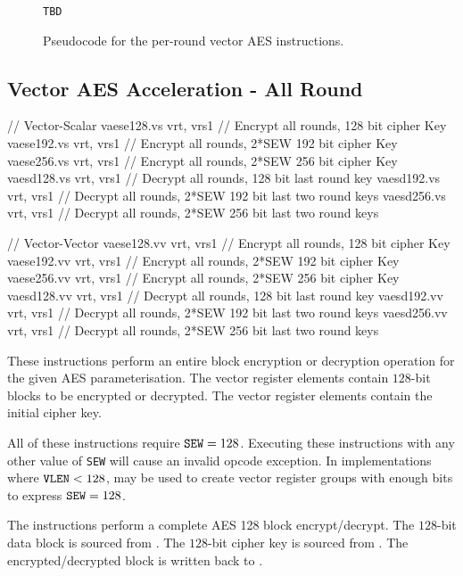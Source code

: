 \begin{figure}[h]
\begin{lstlisting}[language=pseudo]
TBD
\end{lstlisting}
\caption{Pseudocode for the per-round vector AES instructions.}
\label{fig:pseudo:aes:vector:per-round}
\end{figure}


\subsection{Vector AES Acceleration - All Round}
\label{sec:vector:aes:all-round}

\begin{cryptoisa}
// Vector-Scalar
vaese128.vs vrt, vrs1 // Encrypt all rounds,       128 bit cipher Key
vaese192.vs vrt, vrs1 // Encrypt all rounds, 2*SEW 192 bit cipher Key
vaese256.vs vrt, vrs1 // Encrypt all rounds, 2*SEW 256 bit cipher Key
vaesd128.vs vrt, vrs1 // Decrypt all rounds,       128 bit last     round key
vaesd192.vs vrt, vrs1 // Decrypt all rounds, 2*SEW 192 bit last two round keys
vaesd256.vs vrt, vrs1 // Decrypt all rounds, 2*SEW 256 bit last two round keys

// Vector-Vector
vaese128.vv vrt, vrs1 // Encrypt all rounds,       128 bit cipher Key
vaese192.vv vrt, vrs1 // Encrypt all rounds, 2*SEW 192 bit cipher Key
vaese256.vv vrt, vrs1 // Encrypt all rounds, 2*SEW 256 bit cipher Key
vaesd128.vv vrt, vrs1 // Decrypt all rounds,       128 bit last     round key
vaesd192.vv vrt, vrs1 // Decrypt all rounds, 2*SEW 192 bit last two round keys
vaesd256.vv vrt, vrs1 // Decrypt all rounds, 2*SEW 256 bit last two round keys
\end{cryptoisa}

These instructions perform an entire block encryption or decryption
operation for the given AES parameterisation.
The \vrt vector register elements contain $128$-bit blocks
to be encrypted or decrypted.
The  vector register elements contain the initial
cipher key.

All of these instructions require ${\tt SEW}=128$.
Executing these instructions with any other value of {\tt SEW} will cause
an invalid opcode exception.
In implementations where ${\tt VLEN}<128$, \LMUL may be used to create
vector register groups with enough bits to express ${\tt SEW}=128$.

The  instructions perform a complete AES
128 block encrypt/decrypt.
The $128$-bit data block is sourced from \vrt.
The $128$-bit cipher key is sourced from .
The encrypted/decrypted block is written back to \vrt.

